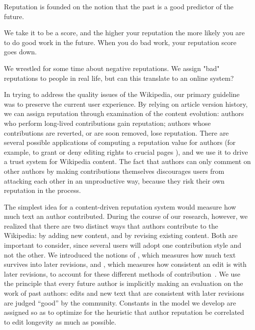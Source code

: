Reputation is founded on the notion that the past is a good predictor of the
future.

We take it to be a score, and the higher your reputation the more likely you
are to do good work in the future. When you do bad work, your reputation score
goes down.

We wrestled for some time about negative reputations. We assign "bad"
reputations to people in real life, but can this translate to an online
system?  


In trying to address the quality issues of the Wikipedia,
our primary guideline was to preserve the current user experience.
By relying on article version history, we can assign reputation
through examination of the content evolution:
authors who perform long-lived contributions gain reputation; authors
whose contributions are reverted, or are soon removed, lose reputation.
There are several possible applications of computing a reputation
value for authors (for example, to grant or deny editing rights to
crucial pages \cite{Blaze96}), and we use it to drive a trust system for
Wikipedia content.
The fact that authors can only comment on other authors by
making contributions themselves discourages users from attacking
each other in an unproductive way, because they risk their own reputation in the process.


The simplest idea for a content-driven reputation system would measure
how much text an author contributed.
During the course of our research, however, we realized that there are
two distinct ways that authors contribute to the Wikipedia: by adding
new content, and by revising existing content.
Both are important to consider, since several users will
adopt one contribution style and not the other.
We introduced the notions of
, which measures how much text survives
into later revisions, and , which measures
how consistent an edit is with later revisions,
to account for these different methods of contribution~\cite{Adler2007}.
We use the principle that every future author is
implicitly making an evaluation on the work of past authors:
edits and new text that are consistent with later revisions
are judged ``good'' by the community.
Constants in the model we develop are assigned so as to optimize
for the heuristic that author reputation
be correlated to edit longevity as much as possible.

